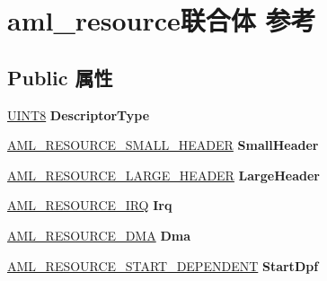 \hypertarget{unionaml__resource}{}\section{aml\+\_\+resource联合体 参考}
\label{unionaml__resource}
\subsection*{Public 属性}
\begin{DoxyCompactItemize}
\item 
\mbox{\label{unionaml__resource_ad07d25d5d718a0516deae4a37635e6f5}} 
\hyperlink{_processor_bind_8h_ab27e9918b538ce9d8ca692479b375b6a}{U\+I\+N\+T8} {\bfseries Descriptor\+Type}
\item 
\mbox{\label{unionaml__resource_aea140085c05085ac77e2f7abaf471df3}} 
\hyperlink{structaml__resource__small__header}{A\+M\+L\+\_\+\+R\+E\+S\+O\+U\+R\+C\+E\+\_\+\+S\+M\+A\+L\+L\+\_\+\+H\+E\+A\+D\+ER} {\bfseries Small\+Header}
\item 
\mbox{\label{unionaml__resource_aab29f6e0fb2491a81a36018bf456c582}} 
\hyperlink{structaml__resource__large__header}{A\+M\+L\+\_\+\+R\+E\+S\+O\+U\+R\+C\+E\+\_\+\+L\+A\+R\+G\+E\+\_\+\+H\+E\+A\+D\+ER} {\bfseries Large\+Header}
\item 
\mbox{\label{unionaml__resource_acc0e286a52f71b39120442adbf84303c}} 
\hyperlink{structaml__resource__irq}{A\+M\+L\+\_\+\+R\+E\+S\+O\+U\+R\+C\+E\+\_\+\+I\+RQ} {\bfseries Irq}
\item 
\mbox{\label{unionaml__resource_abf388f3a289e02d942c0f06270c58f61}} 
\hyperlink{structaml__resource__dma}{A\+M\+L\+\_\+\+R\+E\+S\+O\+U\+R\+C\+E\+\_\+\+D\+MA} {\bfseries Dma}
\item 
\mbox{\label{unionaml__resource_ac82ba929bcdf361e49e8b7f571e6c8eb}} 
\hyperlink{structaml__resource__start__dependent}{A\+M\+L\+\_\+\+R\+E\+S\+O\+U\+R\+C\+E\+\_\+\+S\+T\+A\+R\+T\+\_\+\+D\+E\+P\+E\+N\+D\+E\+NT} {\bfseries Start\+Dpf}
\item 
\mbox{\label{unionaml__resource_a708f8d3d0e45d46da77391d0cea5c026}} 

\end{DoxyCompactItemize}
